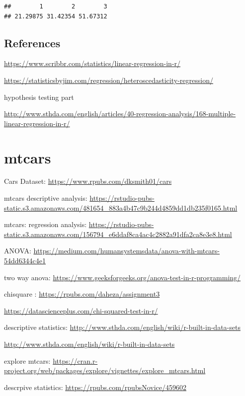 \documentclass[]{book}
\begin{document}
\begin{verbatim}
##        1        2        3 
## 21.29875 31.42354 51.67312
\end{verbatim}

\newpage

\hypertarget{references-1}{%
\section{References}\label{references-1}}

\url{https://www.scribbr.com/statistics/linear-regression-in-r/}

\url{https://statisticsbyjim.com/regression/heteroscedasticity-regression/}

\newpage

hypothesis testing part

\url{http://www.sthda.com/english/articles/40-regression-analysis/168-multiple-linear-regression-in-r/}

\hypertarget{mtcars}{%
\chapter{mtcars}\label{mtcars}}

Cars Dataset: \url{https://www.rpubs.com/dksmith01/cars}

mtcars descriptive analysis: \url{https://rstudio-pubs-static.s3.amazonaws.com/481654_883a4b47c9b244d4859dd1db235f0165.html}

mtcars: regression analysis: \url{https://rstudio-pubs-static.s3.amazonaws.com/156794_e6ddaf8ca4ac4c2882a91dfa2ca8e3e8.html}

ANOVA: \url{https://medium.com/humansystemsdata/anova-with-mtcars-54dd6344c4e1}

two way anova: \url{https://www.geeksforgeeks.org/anova-test-in-r-programming/}

chisquare : \url{https://rpubs.com/daheza/assignment3}

\url{https://datascienceplus.com/chi-squared-test-in-r/}

descriptive statistics: \url{http://www.sthda.com/english/wiki/r-built-in-data-sets}

\url{http://www.sthda.com/english/wiki/r-built-in-data-sets}

explore mtcars: \url{https://cran.r-project.org/web/packages/explore/vignettes/explore_mtcars.html}

descrpive statistics: \url{https://rpubs.com/rpubsNovice/459602}
\end{document}
